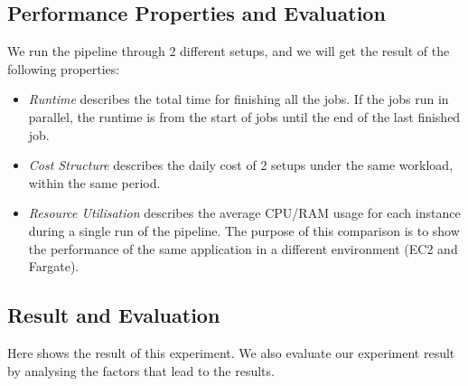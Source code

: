\subsection{Performance Properties and Evaluation}
We run the pipeline through 2 different setups, and we will get the result of the following properties:
\begin{itemize}
\item \textit{Runtime} describes the total time for finishing all the jobs. If the jobs run in parallel, the runtime is from the start of jobs until the end of the last finished job.
\item \textit{Cost Structure} describes the daily cost of 2 setups under the same workload, within the same period.
\item \textit{Resource Utilisation} describes the average CPU/RAM usage for each instance during a single run of the pipeline. The purpose of this comparison is to show the performance of the same application in a different environment (EC2 and Fargate).
\end{itemize}
\subsection{Result and Evaluation}
Here shows the result of this experiment. We also evaluate our experiment result by analysing the factors that lead to the results.
